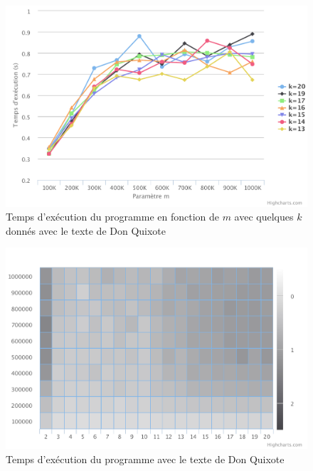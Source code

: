 \documentclass[10pt, a4paper]{article}
\begin{document}
\begin{figure}[ht]
    \centering
    \includegraphics[width=1.0\textwidth]{time-don-quixote-plot-m}
    \caption{Temps d'exécution du programme en fonction de $m$ avec quelques $k$ donnés avec le texte de Don Quixote}
    \label{fig:time-don-quixote-plot-m}
\end{figure}

\begin{figure}[ht]
    \centering
    \includegraphics[width=1.0\textwidth]{time-don-quixote}
    \caption{Temps d'exécution du programme avec le texte de Don Quixote}
    \label{fig:time-don-quixote}
\end{figure}
\end{document}
